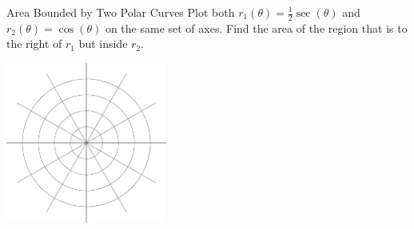 \begin{exercise}{Area Bounded by Two Polar Curves \Coffeecup \Coffeecup \Coffeecup}
Plot both $r_1(\theta)=\frac{1}{2}\sec(\theta)$ and $r_2(\theta)=\cos(\theta)$ on the same set of axes.  Find the area of the region that is to the right of $r_1$ but inside $r_2$.
	\begin{center}
		\includegraphics[width=150pt]{polar.eps}
	\end{center}
\vspace*{3in}
\end{exercise}

